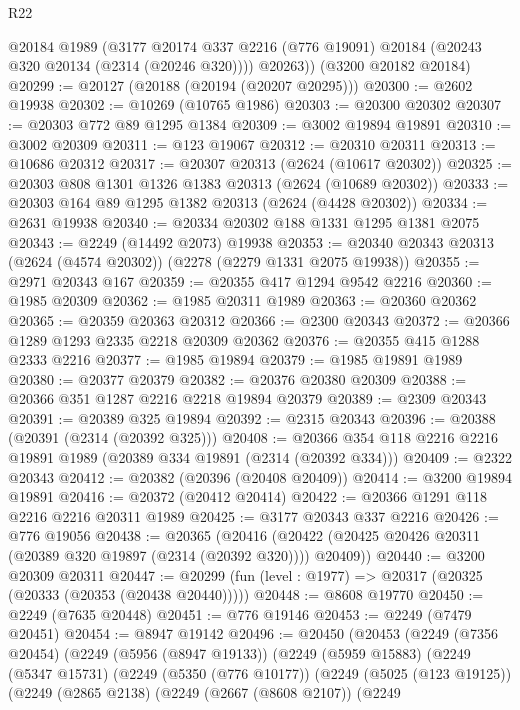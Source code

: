 \begin{lexlean}{R22}
\begin{coremodule}
        @20184
        @1989
        (@3177 @20174 @337 @2216 (@776 @19091) @20184 (@20243 @320 @20134 (@2314 (@20246 @320))))
        @20263))
    (@3200 @20182 @20184)
@20299 := @20127 (@20188 (@20194 (@20207 @20295)))
@20300 := @2602 @19938
@20302 := @10269 (@10765 @1986)
@20303 := @20300 @20302
@20307 := @20303 @772 @89 @1295 @1384
@20309 := @3002 @19894 @19891
@20310 := @3002 @20309
@20311 := @123 @19067
@20312 := @20310 @20311
@20313 := @10686 @20312
@20317 := @20307 @20313 (@2624 (@10617 @20302))
@20325 := @20303 @808 @1301 @1326 @1383 @20313 (@2624 (@10689 @20302))
@20333 := @20303 @164 @89 @1295 @1382 @20313 (@2624 (@4428 @20302))
@20334 := @2631 @19938
@20340 := @20334 @20302 @188 @1331 @1295 @1381 @2075
@20343 := @2249 (@14492 @2073) @19938
@20353 := @20340 @20343 @20313 (@2624 (@4574 @20302)) (@2278 (@2279 @1331 @2075 @19938))
@20355 := @2971 @20343 @167
@20359 := @20355 @417 @1294 @9542 @2216
@20360 := @1985 @20309
@20362 := @1985 @20311 @1989
@20363 := @20360 @20362
@20365 := @20359 @20363 @20312
@20366 := @2300 @20343
@20372 := @20366 @1289 @1293 @2335 @2218 @20309 @20362
@20376 := @20355 @415 @1288 @2333 @2216
@20377 := @1985 @19894
@20379 := @1985 @19891 @1989
@20380 := @20377 @20379
@20382 := @20376 @20380 @20309
@20388 := @20366 @351 @1287 @2216 @2218 @19894 @20379
@20389 := @2309 @20343
@20391 := @20389 @325 @19894
@20392 := @2315 @20343
@20396 := @20388 (@20391 (@2314 (@20392 @325)))
@20408 := @20366 @354 @118 @2216 @2216 @19891 @1989 (@20389 @334 @19891 (@2314 (@20392 @334)))
@20409 := @2322 @20343
@20412 := @20382 (@20396 (@20408 @20409))
@20414 := @3200 @19894 @19891
@20416 := @20372 (@20412 @20414)
@20422 := @20366 @1291 @118 @2216 @2216 @20311 @1989
@20425 := @3177 @20343 @337 @2216
@20426 := @776 @19056
@20438 := @20365
    (@20416 (@20422 (@20425 @20426 @20311 (@20389 @320 @19897 (@2314 (@20392 @320)))) @20409))
@20440 := @3200 @20309 @20311
@20447 := @20299 (fun (level : @1977) => @20317 (@20325 (@20333 (@20353 (@20438 @20440)))))
@20448 := @8608 @19770
@20450 := @2249 (@7635 @20448)
@20451 := @776 @19146
@20453 := @2249 (@7479 @20451)
@20454 := @8947 @19142
@20496 := @20450
    (@20453
      (@2249
        (@7356 @20454)
        (@2249
          (@5956 (@8947 @19133))
          (@2249
            (@5959 @15883)
            (@2249
              (@5347 @15731)
              (@2249
                (@5350 (@776 @10177))
                (@2249
                  (@5025 (@123 @19125))
                  (@2249
                    (@2865 @2138)
                    (@2249
                      (@2667 (@8608 @2107))
                      (@2249

\end{coremodule}
\end{lexlean}
